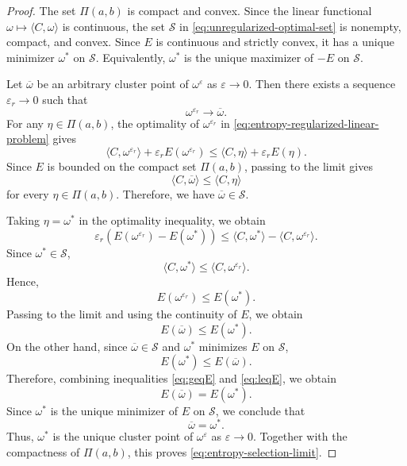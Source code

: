 \documentclass[a4paper,11pt]{article}
\numberwithin{equation}{section}
\newcommand{\eps}{\varepsilon}
\begin{document}
\begin{proof}
The set $\Pi(a,b)$ is compact and convex. Since the linear functional $\omega\mapsto\langle C,\omega\rangle$ is continuous, the set $\mathcal S$ in \eqref{eq:unregularized-optimal-set} is nonempty, compact, and convex. Since $E$ is continuous and strictly convex, it has a unique minimizer $\omega^*$ on $\mathcal S$. Equivalently, $\omega^*$ is the unique maximizer of $-E$ on $\mathcal S$.

Let $\overline\omega$ be an arbitrary cluster point of $\omega^\eps$ as $\eps\to0$. Then there exists a sequence $\eps_r\to0$ such that
\begin{equation*}
  \omega^{\eps_r}\to\overline\omega.
\end{equation*}
For any $\eta\in\Pi(a,b)$, the optimality of $\omega^{\eps_r}$ in \eqref{eq:entropy-regularized-linear-problem} gives
\begin{equation*}
  \langle C,\omega^{\eps_r}\rangle+\eps_r E(\omega^{\eps_r})\leq \langle C,\eta\rangle+\eps_r E(\eta).
\end{equation*}
Since $E$ is bounded on the compact set $\Pi(a,b)$, passing to the limit gives
\begin{equation*}
  \langle C,\overline\omega\rangle
  \leq
  \langle C,\eta\rangle
\end{equation*}
for every $\eta\in\Pi(a,b)$. Therefore, we have $\overline\omega\in\mathcal S$.

Taking $\eta=\omega^*$ in the optimality inequality, we obtain
\begin{equation*}
  \eps_r\left(E(\omega^{\eps_r})-E(\omega^*)\right)\leq\langle C,\omega^*\rangle-\langle C,\omega^{\eps_r}\rangle.
\end{equation*}
Since $\omega^*\in\mathcal S$,
\begin{equation*}
  \langle C,\omega^*\rangle \leq \langle C,\omega^{\eps_r}\rangle.
\end{equation*}
Hence,
\begin{equation*}
  E(\omega^{\eps_r})\leq E(\omega^*).
\end{equation*}
Passing to the limit and using the continuity of $E$, we obtain
\begin{equation}\label{eq:geqE}
  E(\overline\omega)\leq E(\omega^*).
\end{equation}
On the other hand, since $\overline\omega\in\mathcal S$ and $\omega^*$ minimizes $E$ on $\mathcal S$,
\begin{equation}\label{eq:leqE}
  E(\omega^*)\leq E(\overline\omega).
\end{equation}
Therefore, combining inequalities \eqref{eq:geqE} and \eqref{eq:leqE}, we obtain
\begin{equation*}
  E(\overline\omega)=E(\omega^*).
\end{equation*}
Since $\omega^*$ is the unique minimizer of $E$ on $\mathcal S$, we conclude that
\begin{equation*}
  \overline\omega=\omega^*.
\end{equation*}
Thus, $\omega^*$ is the unique cluster point of $\omega^\eps$ as $\eps\to0$. Together with the compactness of $\Pi(a,b)$, this proves \eqref{eq:entropy-selection-limit}.
\end{proof}
\end{document}
